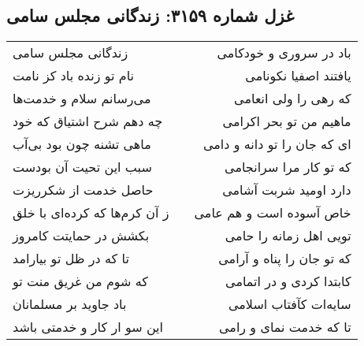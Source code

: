 \begin{center}
\section*{غزل شماره ۳۱۵۹: زندگانی مجلس سامی}
\label{sec:3159}
\begin{longtable}{l p{0.5cm} r}
زندگانی مجلس سامی
&&
باد در سروری و خودکامی
\\
نام تو زنده باد کز نامت
&&
یافتند اصفیا نکونامی
\\
می‌رسانم سلام و خدمت‌ها
&&
که رهی را ولی انعامی
\\
چه دهم شرح اشتیاق که خود
&&
ماهیم من تو بحر اکرامی
\\
ماهی تشنه چون بود بی‌آب
&&
ای که جان را تو دانه و دامی
\\
سبب این تحیت آن بودست
&&
که تو کار مرا سرانجامی
\\
حاصل خدمت از شکرریزت
&&
دارد اومید شربت آشامی
\\
ز آن کرم‌ها که کرده‌ای با خلق
&&
خاص آسوده است و هم عامی
\\
بکشش در حمایتت کامروز
&&
تویی اهل زمانه را حامی
\\
تا که در ظل تو بیارامد
&&
که تو جان را پناه و آرامی
\\
که شوم من غریق منت تو
&&
کابتدا کردی و در اتمامی
\\
باد جاوید بر مسلمانان
&&
سایه‌ات کآفتاب اسلامی
\\
این سو ار کار و خدمتی باشد
&&
تا که خدمت نمای و رامی
\\
\end{longtable}
\end{center}
